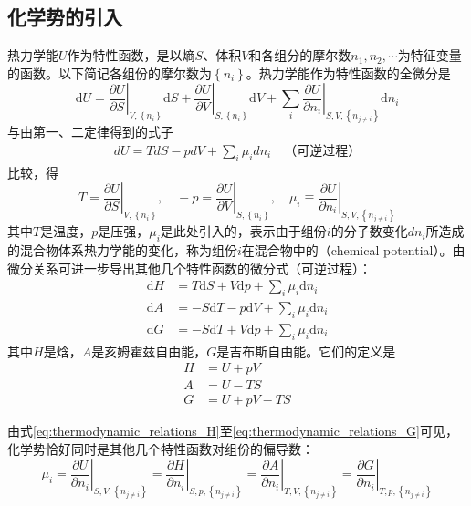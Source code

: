 \documentclass[main.tex]{subfiles}
\begin{document}
\subsection{化学势的引入}
热力学能$U$作为特性函数，是以熵$S$、体积$V$和各组分的摩尔数$n_1,n_2,\cdots$为特征变量的函数。以下简记各组份的摩尔数为$\left\{n_i\right\}$。热力学能作为特性函数的全微分是
\[\mathrm{d}U=\left.\frac{\partial U}{\partial S}\right|_{V,\left\{n_i\right\}}\mathrm{d}S+\left.\frac{\partial U}{\partial V}\right|_{S,\left\{n_i\right\}}\mathrm{d}V+\sum_i\left.\frac{\partial U}{\partial n_i}\right|_{S,V,\left\{n_{j\neq i}\right\}}\mathrm{d}n_i\]
与由第一、二定律得到的式子
\begin{align}
dU=TdS-pdV+\sum_i\mu_idn_i\quad\text{（可逆过程）}\label{eq:thermodynamic_relations_U}
\end{align}
比较，得
\[T=\left.\frac{\partial U}{\partial S}\right|_{V,\left\{n_i\right\}},\quad-p=\left.\frac{\partial U}{\partial V}\right|_{S,\left\{n_i\right\}},\quad\mu_i\equiv\left.\frac{\partial U}{\partial n_i}\right|_{S,V,\left\{n_{j\neq i}\right\}}\]
其中$T$是温度，$p$是压强，$\mu_i$是此处引入的，表示由于组份$i$的分子数变化$dn_i$所造成的混合物体系热力学能的变化，称为组份$i$在混合物中的（chemical potential）。由微分关系可进一步导出其他几个特性函数的微分式（可逆过程）：
\begin{align}    \mathrm{d}H&=T\mathrm{d}S+V\mathrm{d}p+\sum_i\mu_i\mathrm{d}n_i\label{eq:thermodynamic_relations_H}\\
    \mathrm{d}A&=-S\mathrm{d}T-p\mathrm{d}V+\sum_i\mu_i\mathrm{d}n_i\label{eq:thermodynamic_relations_A}\\
    \mathrm{d}G&=-S\mathrm{d}T+V\mathrm{d}p+\sum_i\mu_i\mathrm{d}n_i\label{eq:thermodynamic_relations_G}
\end{align}
其中$H$是焓，$A$是亥姆霍兹自由能，$G$是吉布斯自由能。它们的定义是
\begin{align}
    H&=U+pV\label{eq:def_of_H}\\
    A&=U-TS\label{eq:def_of_A}\\
    G&=U+pV-TS\label{eq:def_of_G}
\end{align}

由式\eqref{eq:thermodynamic_relations_H}至\eqref{eq:thermodynamic_relations_G}可见，化学势恰好同时是其他几个特性函数对组份的偏导数：
\begin{equation}
\label{eq:chemical_potential_as_partial_molar_characteristic_functions}
\mu_i=\left.\frac{\partial U}{\partial n_i}\right|_{S,V,\left\{n_{j\neq i}\right\}}=\left.\frac{\partial H}{\partial n_i}\right|_{S,p,\left\{n_{j\neq i}\right\}}=\left.\frac{\partial A}{\partial n_i}\right|_{T,V,\left\{n_{j\neq i}\right\}}=\left.\frac{\partial G}{\partial n_i}\right|_{T,p,\left\{n_{j\neq i}\right\}}
\end{equation}
\end{document}
